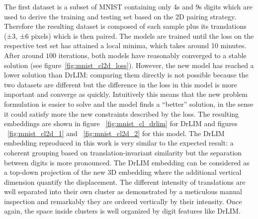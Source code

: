 \documentclass[a4paper,12pt]{report}
\begin{document}
The first dataset is a subset of MNIST containing only 4s and 9s digits which are used to derive the training and testing set based on the 2D pairing strategy.
Therefore the resulting dataset is composed of each sample plus its translations (±3, ±6 pixels) which is then paired.
The models are trained until the loss on the respective test set has attained a local minima, which takes around 10 minutes.
After around $100$ iterations, both models have reasonably converged to a stable solution (see figure~\ref{fig:mnist_cl2d_loss}).
However, the new model has reached a lower solution than DrLIM: comparing them directly is not possible because the two datasets are different but the difference in the loss in this model is more important and converge as quickly.
Intuitively this means that the new problem formulation is easier to solve and the model finds a ``better'' solution, in the sense it could satisfy more the new constraints described by the loss.
The resulting embeddings are shown in figure ~\ref{fig:mnist_cl_drlim} for DrLIM and figures ~\ref{fig:mnist_cl2d_1} and ~\ref{fig:mnist_cl2d_2} for this model.
The DrLIM embedding reproduced in this work is very similar to the expected result: a coherent grouping based on translation-invariant similarity but the separation between digits is more pronounced.
The DrLIM embedding can be considered as a top-down projection of the new 3D embedding where the additional vertical dimension quantify the displacement.
The different intensity of translations are well separated into their own cluster as demonstrated by a meticulous manual inspection and remarkably they are ordered vertically by their intensity.
Once again, the space inside clusters is well organized by digit features like DrLIM.
\end{document}
